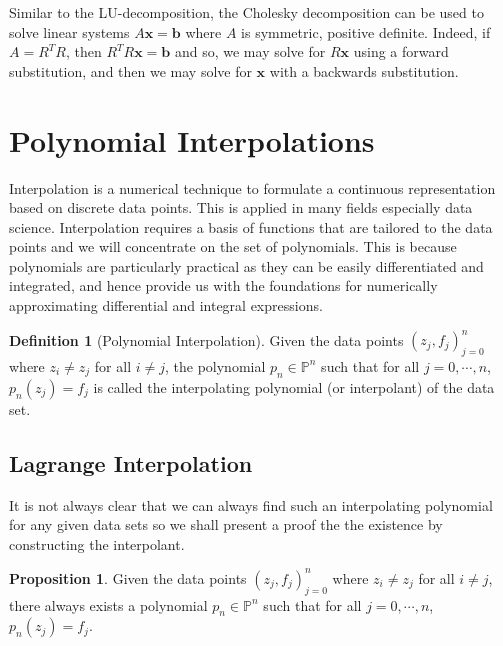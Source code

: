 \documentclass[
]{article}
\theoremstyle{definition}
\newtheorem{prop}{Proposition}
\theoremstyle{definition}
\newtheorem{definition}{Definition}[section]
\begin{document}
Similar to the LU-decomposition, the Cholesky decomposition can be used
to solve linear systems \(A\mathbf{x} = \mathbf{b}\) where \(A\) is
symmetric, positive definite. Indeed, if \(A = R^T R\), then
\(R^T R \mathbf{x} = \mathbf{b}\) and so, we may solve for
\(R \mathbf{x}\) using a forward substitution, and then we may solve for
\(\mathbf{x}\) with a backwards substitution.

\newpage

\hypertarget{polynomial-interpolations}{%
\section{Polynomial Interpolations}\label{polynomial-interpolations}}

Interpolation is a numerical technique to formulate a continuous
representation based on discrete data points. This is applied in many
fields especially data science. Interpolation requires a basis of
functions that are tailored to the data points and we will concentrate
on the set of polynomials. This is because polynomials are particularly
practical as they can be easily differentiated and integrated, and hence
provide us with the foundations for numerically approximating
differential and integral expressions.

\begin{definition}[Polynomial Interpolation]
  Given the data points \((z_j, f_j)_{j = 0}^n\) where \(z_i \neq z_j\) for all 
  \(i \neq j\), the polynomial \(p_n \in \mathbb{P}^n\) such that for all \(j = 0, \cdots, n\), 
  \(p_n(z_j) = f_j\) is called the interpolating polynomial (or interpolant) 
  of the data set.
\end{definition}

\hypertarget{lagrange-interpolation}{%
\subsection{Lagrange Interpolation}\label{lagrange-interpolation}}

It is not always clear that we can always find such an interpolating
polynomial for any given data sets so we shall present a proof the the
existence by constructing the interpolant.

\begin{prop}
  Given the data points \((z_j, f_j)_{j = 0}^n\) where \(z_i \neq z_j\) for all 
  \(i \neq j\), there always exists a polynomial \(p_n \in \mathbb{P}^n\) such 
  that for all \(j = 0, \cdots, n\), \(p_n(z_j) = f_j\).
\end{prop}
\proof
\end{document}
